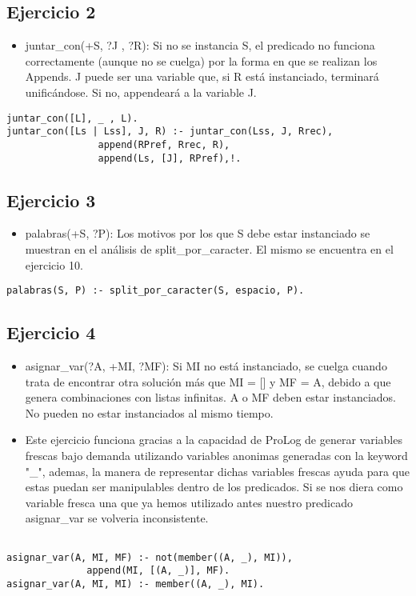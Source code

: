 \documentclass[spanish, 10pt,a4paper]{article}
\numberwithin{equation}{section} %
\begin{document}
\subsection{Ejercicio 2}

\begin{itemize}
\item juntar\_con(+S, ?J , ?R): Si no se instancia S, el predicado no funciona correctamente (aunque no se cuelga) por la forma en que se realizan los Appends. 
J puede ser una variable que, si R está instanciado, terminará unificándose. Si no, appendeará a la variable J.
\end{itemize}
\begin{lstlisting}
juntar_con([L], _ , L).
juntar_con([Ls | Lss], J, R) :- juntar_con(Lss, J, Rrec), 
				append(RPref, Rrec, R), 
				append(Ls, [J], RPref),!.  
\end{lstlisting}

\subsection{Ejercicio 3}

\begin{itemize}
\item palabras(+S, ?P): Los motivos por los que S debe estar instanciado se muestran en el análisis de split\_por\_caracter. El mismo se encuentra en el ejercicio 10.
\end{itemize}
\begin{lstlisting}
palabras(S, P) :- split_por_caracter(S, espacio, P).  
\end{lstlisting}

\subsection{Ejercicio 4}

\begin{itemize}
\item asignar\_var(?A, +MI, ?MF): Si MI no está instanciado, se cuelga cuando trata de encontrar otra solución más que MI = [] y MF = A, debido a que genera
combinaciones con listas infinitas. A o MF deben estar instanciados. No pueden no estar instanciados al mismo tiempo.

\item Este ejercicio funciona gracias a la capacidad de ProLog de generar variables frescas bajo demanda utilizando 
variables anonimas generadas con la keyword "\_", ademas, la manera de representar dichas variables frescas ayuda para que estas puedan ser manipulables dentro de los predicados.
Si se nos diera como variable fresca una que ya hemos utilizado antes nuestro predicado asignar\_var se volveria inconsistente.
\end{itemize}
\begin{lstlisting}

asignar_var(A, MI, MF) :- not(member((A, _), MI)), 
			  append(MI, [(A, _)], MF).
asignar_var(A, MI, MI) :- member((A, _), MI).

\end{lstlisting}
\end{document}
